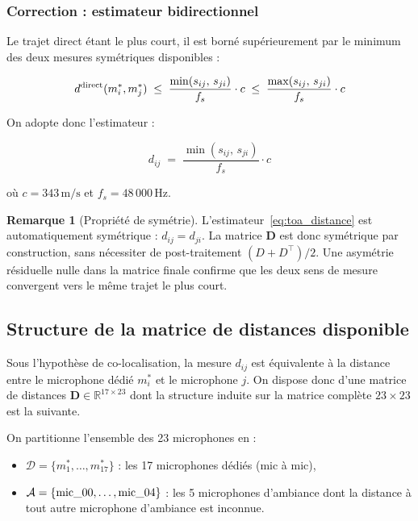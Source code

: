 \documentclass[12pt, a4paper]{article}
\theoremstyle{plain}
\theoremstyle{definition}
\newtheorem{remark}[theorem]{Remarque}
\newcommand{\R}{\mathbb{R}}
\newcommand{\mat}[1]{\mathbf{#1}}
\begin{document}
\subsubsection{Correction : estimateur bidirectionnel}

Le trajet direct étant le plus court, il est borné supérieurement par le
minimum des deux mesures symétriques disponibles :

\begin{equation}
    d^{\rm direct}(m^*_i, m^*_j) \;\leq\;
    \frac{\min(s_{ij},\, s_{ji})}{f_s} \cdot c
    \;\leq\;
    \frac{\max(s_{ij},\, s_{ji})}{f_s} \cdot c
    \label{eq:toa_bounds}
\end{equation}

On adopte donc l'estimateur :

\begin{equation}
    \boxed{d_{ij} \;=\; \frac{\min(s_{ij},\, s_{ji})}{f_s} \cdot c}
    \label{eq:toa_distance}
\end{equation}

où $c = 343\,\text{m/s}$ et $f_s = 48\,000\,\text{Hz}$.

\begin{remark}[Propriété de symétrie]
    L'estimateur~\eqref{eq:toa_distance} est automatiquement symétrique :
    $d_{ij} = d_{ji}$.  La matrice $\mat{D}$ est donc symétrique par
    construction, sans nécessiter de post-traitement $(D + D^\top)/2$.
    Une asymétrie résiduelle nulle dans la matrice finale confirme que les
    deux sens de mesure convergent vers le même trajet le plus court.
\end{remark}

\subsection{Structure de la matrice de distances disponible}

Sous l'hypothèse de co-localisation, la mesure $d_{ij}$ est équivalente à la
distance entre le microphone dédié $m^*_i$ et le microphone $j$. On dispose
donc d'une matrice de distances $\mat{D} \in \R^{17 \times 23}$ dont la
structure induite sur la matrice complète $23 \times 23$ est la suivante.

On partitionne l'ensemble des 23 microphones en :
\begin{itemize}
    \item $\mathcal{D} = \{m^*_1, \ldots, m^*_{17}\}$ : les 17 microphones
        dédiés (mic à mic),
    \item $\mathcal{A} = \{\text{mic\textunderscore 00}, \ldots,
        \text{mic\textunderscore 04}\}$ : les 5 microphones d'ambiance dont
        la distance à tout autre microphone d'ambiance est inconnue.
\end{itemize}
\end{document}
